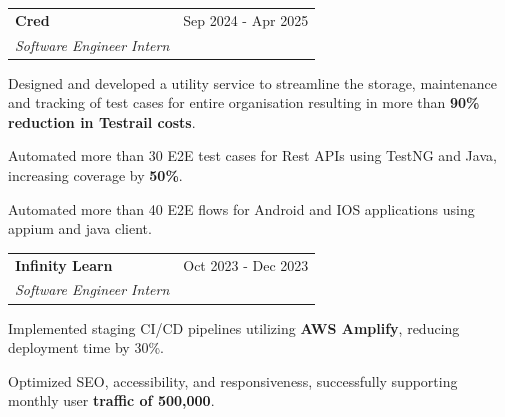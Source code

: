 \documentclass[a4paper,20pt]{article}
\makeatletter
\newcommand{\resumeSubheading}[4]{
  \vspace{-1pt}\item
    \begin{tabular*}{0.97\textwidth}{l@{\extracolsep{\fill}}r}
      \textbf{#1} & #2 \\
      \textit{#3} & \textit{#4} \\
    \end{tabular*}\vspace{-5pt}
}
\makeatother
\begin{document}
    \resumeSubheading{Cred}{Sep 2024 - Apr 2025}
    {Software Engineer Intern}{}
    \begin{description}[font=$\bullet$]
    \item {Designed and developed a utility service to streamline the storage, maintenance and tracking of test cases for entire organisation resulting in more than \textbf{90\% reduction in Testrail costs}.}
    \vspace{-2pt}
    \item {Automated more than 30 E2E test cases for Rest APIs using TestNG and Java, increasing coverage by \textbf{50\%}.}
    \vspace{-2pt}  
    \item {Automated more than 40 E2E flows for Android and IOS applications using appium and java client.}
    \end{description}


    \resumeSubheading{Infinity Learn}{Oct 2023 - Dec 2023}
    {Software Engineer Intern}{}
    \begin{description}[font=$\bullet$]
    \item {Implemented staging CI/CD pipelines utilizing \textbf{AWS Amplify}, reducing deployment time by 30\%.}
    \vspace{-2pt}  
    \item {Optimized SEO, accessibility, and responsiveness, successfully supporting monthly user \textbf{traffic of 500,000}.}
    \end{description}
\end{document}
